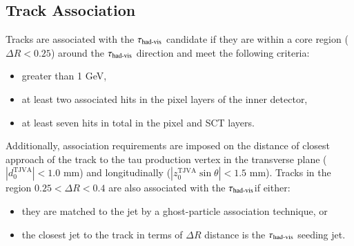     \subsection {Track Association}
        Tracks are associated with the $\tau_{\text{had-vis}}$ candidate if they are within a core region 
        (\(\Delta R < 0.25\)) around the $\tau_{\text{had-vis}}$ direction and meet the following criteria:
        \begin{itemize}
            \item \pt greater than 1 GeV,
            \item at least two associated hits in the pixel layers of the inner detector,
            \item at least seven hits in total in the pixel and SCT layers.
        \end{itemize}
        Additionally, association requirements are imposed on the distance of closest approach of the track 
        to the tau production vertex in the transverse plane (\(|d_{0}^{\text{TJVA}}| < 1.0\) mm) and 
        longitudinally (\(|z_{0}^{\text{TJVA}} \sin \theta | < 1.5\) mm).
        Tracks in the region \(0.25 < \Delta R < 0.4\) are also associated with the $\tau_{\text{had-vis}}$if either:
        \begin{itemize}
            \item they are matched to the \tauseed jet by a ghost-particle association technique, or
            \item the closest jet to the track in terms of \(\Delta R\) distance is the $\tau_{\text{had-vis}}$ seeding jet.
        \end{itemize}
    
